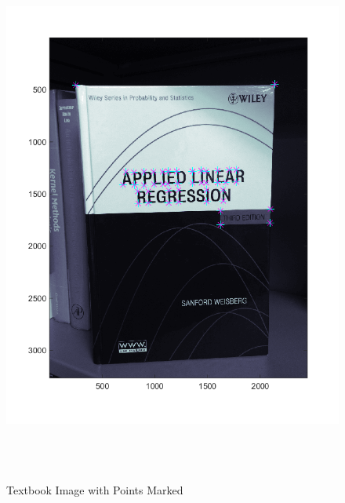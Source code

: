 \documentclass[11pt,psfig]{article}
\begin{document}
\begin{figure}[H]
\centering
\includegraphics[height=7in]{book_prob2Points.png}
\caption{Textbook Image with Points Marked}
\label{p2b}
\end{figure}
\end{document}
